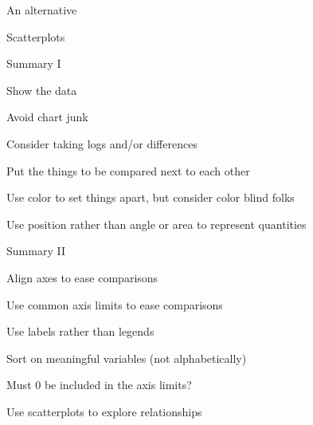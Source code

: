 \documentclass[aspectratio=169,12pt,t]{beamer}
\begin{document}
\begin{frame}[c]{An alternative}


\note{
}
\end{frame}

\begin{frame}[c]{Scatterplots}


\note{
}
\end{frame}



\begin{frame}{Summary I}

\bbi
\item Show the data

\item Avoid chart junk

\item Consider taking logs and/or differences

\item Put the things to be compared next to each other

\item Use color to set things apart, but consider color blind folks

\item Use position rather than angle or area to represent quantities
\ei

\note{
}
\end{frame}



\begin{frame}{Summary II}

\bbi
\item Align axes to ease comparisons

\item Use common axis limits to ease comparisons

\item Use labels rather than legends

\item Sort on meaningful variables (not alphabetically)

\item Must 0 be included in the axis limits?

\item Use scatterplots to explore relationships
\ei

\note{
}
\end{frame}
\end{document}
